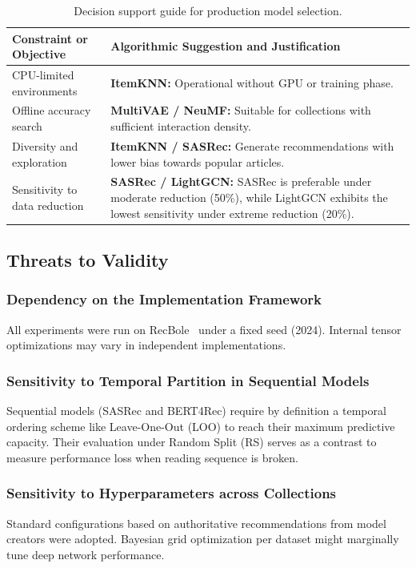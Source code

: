 \documentclass[journal]{IEEEtran}
\begin{document}
\begin{table}[H]
\centering
\caption{Decision support guide for production model selection.}
\label{tab:decision}
\footnotesize
\setlength{\tabcolsep}{3pt}
\begin{tabular}{p{2.3cm}p{5.5cm}}
\toprule
\textbf{Constraint or Objective} & \textbf{Algorithmic Suggestion and Justification} \\
\midrule
CPU-limited environments & \textbf{ItemKNN:} Operational without GPU or training phase. \\
Offline accuracy search & \textbf{MultiVAE / NeuMF:} Suitable for collections with sufficient interaction density. \\
Diversity and exploration & \textbf{ItemKNN / SASRec:} Generate recommendations with lower bias towards popular articles. \\
Sensitivity to data reduction & \textbf{SASRec / LightGCN:} SASRec is preferable under moderate reduction (50\%), while LightGCN exhibits the lowest sensitivity under extreme reduction (20\%). \\
\bottomrule
\end{tabular}
\end{table}

\subsection{Threats to Validity}

\subsubsection{Dependency on the Implementation Framework}
All experiments were run on RecBole~\cite{zhao2021recbole} under a fixed seed (2024). Internal tensor optimizations may vary in independent implementations.

\subsubsection{Sensitivity to Temporal Partition in Sequential Models}
Sequential models (SASRec and BERT4Rec) require by definition a temporal ordering scheme like Leave-One-Out (LOO) to reach their maximum predictive capacity. Their evaluation under Random Split (RS) serves as a contrast to measure performance loss when reading sequence is broken.

\subsubsection{Sensitivity to Hyperparameters across Collections}
Standard configurations based on authoritative recommendations from model creators were adopted. Bayesian grid optimization per dataset might marginally tune deep network performance.
\end{document}
